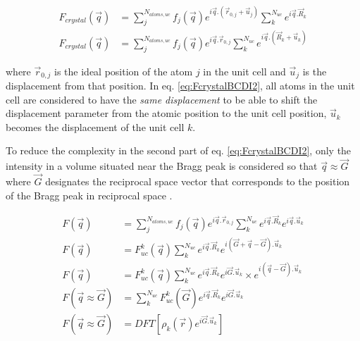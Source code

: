 \begin{align}
    \label{eq:FcrystalBCDI1}
    F_{crystal}(\vec{q}) & = \sum_j^{N_{atoms, uc}} f_j(\vec{q}) e^{i\vec{q}.(\vec{r}_{0,j} + \vec{u}_{j})} \sum_k^{N_{uc}} e^{i\vec{q}.\vec{R}_k}\\
    \label{eq:FcrystalBCDI2}
    F_{crystal}(\vec{q}) & = \sum_j^{N_{atoms, uc}} f_j(\vec{q}) e^{i\vec{q}.\vec{r}_{0,j}} \sum_k^{N_{uc}} e^{i\vec{q}.(\vec{R}_k + \vec{u}_{k})}
\end{align}

where $\vec{r}_{0,j}$ is the ideal position of the atom $j$ in the unit cell and $\vec{u}_{j}$ is the displacement from that position.
In eq. \ref{eq:FcrystalBCDI2}, all atoms in the unit cell are considered to have the \textit{same displacement} to be able to shift the displacement parameter from the atomic position to the unit cell position, $\vec{u}_{k}$ becomes the displacement of the unit cell $k$.

To reduce the complexity in the second part of eq. \ref{eq:FcrystalBCDI2}, only the intensity in a volume situated near the Bragg peak is considered so that $\vec{q} \approx \vec{G}$ where $\vec{G}$ designates the reciprocal space vector that corresponds to the position of the Bragg peak in reciprocal space \parencite{Pfeifer2006, Minkevich2007, Harder2007}.

\begin{align}
    \label{eq:FcrystalBCDI3}
    F(\vec{q}) & = \sum_j^{N_{atoms, uc}} f_j(\vec{q}) e^{i\vec{q}.\vec{r}_{0,j}} \sum_k^{N_{uc}} e^{i\vec{q}.\vec{R}_k} e^{i\vec{q}.\vec{u}_k}\\
    \label{eq:FcrystalBCDI4}
    F(\vec{q}) & = F_{uc}^k(\vec{q}) \sum_k^{N_{uc}} e^{i\vec{q}.\vec{R}_k} e^{i(\vec{G}+\vec{q}-\vec{G}).\vec{u}_k}\\
    \label{eq:FcrystalBCDI5}
    F(\vec{q}) & = F_{uc}^k(\vec{q}) \sum_k^{N_{uc}} e^{i\vec{q}.\vec{R}_k} e^{i\vec{G}.\vec{u}_k} \times e^{i(\vec{q}-\vec{G}).\vec{u}_k}\\
    \label{eq:FcrystalBCDI6}
    F(\vec{q} \approx \vec{G}) & = \sum_k^{N_{uc}} F_{uc}^k(\vec{G}) e^{i\vec{q}.\vec{R}_k} e^{i\vec{G}.\vec{u}_k}\\
    \label{eq:FcrystalBCDI7}
    F(\vec{q} \approx \vec{G}) & = DFT[\rho_k(\vec{r}) e^{i\vec{G}.\vec{u}_k}]
\end{align}

